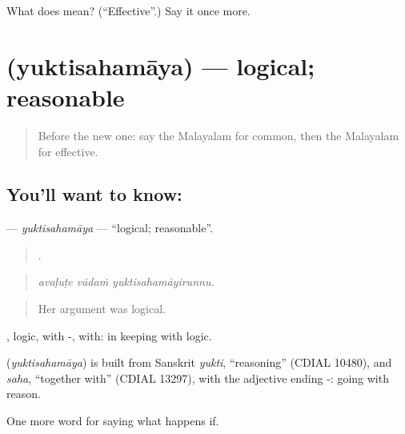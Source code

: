 \begin{tcolorbox}[breakable,colback=teal!4,colframe=teal!35!black,title={Before you move on}]
What does  mean? (\textquotedblleft{}Effective\textquotedblright{}.) Say it once more.
\end{tcolorbox}
\section[\texorpdfstring{\ml{യുക്തിസഹമായ} (yuktisahamāya)}{യുക്തിസഹമായ (yuktisahamāya)}]{ (yuktisahamāya) — logical; reasonable}

\label{lesson:ML-C446-yuktisahamaya}



\begin{quote}
Before the new one: say the Malayalam for common, then the Malayalam for effective.
\end{quote}

\subsection*{You'll want to know: }
\textbf{} — \emph{yuktisahamāya} — \textquotedblleft{}logical; reasonable\textquotedblright{}.

\begin{quote}
  .
\end{quote}

\begin{quote}
\emph{avaḷuṭe vādaṁ yuktisahamāyirunnu.}
\end{quote}

\begin{quote}
Her argument was logical.
\end{quote}

, logic, with -, with: in keeping with logic.

\begin{cousinweb}
\textbf{} (\emph{yuktisahamāya}) is built from Sanskrit \emph{yukti}, \textquotedblleft{}reasoning\textquotedblright{} (CDIAL 10480), and \emph{saha}, \textquotedblleft{}together with\textquotedblright{} (CDIAL 13297), with the adjective ending -: going with reason.
\end{cousinweb}

\begin{grammarlens}[title={What you've built}]
One more word for saying what happens if.
\end{grammarlens}

